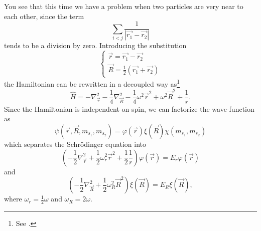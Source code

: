 \documentclass[a4paper,twoside,11pt]{book}
\begin{document}
You see that this time we have a problem when two particles are very near to each other, since the term
\begin{equation*}
	\sum_{i<j}\frac{1}{|\vec{r_1}-\vec{r_2}|}
\end{equation*}
tends to be a division by zero. Introducing the substitution
\begin{equation}
\begin{cases}
\vec{r}=\vec{r_1}-\vec{r_2} \\ 
\vec{R}=\frac{1}{2}(\vec{r_1}+\vec{r_2}) 
\end{cases}
\end{equation}
the Hamiltonian can be rewritten in a decoupled way as\footnote{See \cite{taut}.}
\begin{equation}
    \hat{H} = -\nabla_{\vec{r}}^2 - \frac{1}{4}\nabla_{\vec{R}}^2 - \frac{1}{4}\omega^2\vec{r}^2 + \omega^2\vec{R}^2 + \frac{1}{r}.
\end{equation}
Since the Hamiltonian is independent on spin, we can factorize the wave-function as
\begin{equation}
    \psi(\vec{r},\vec{R},m_{s_1},m_{s_2}) = \varphi(\vec{r})\xi(\vec{R})\chi(m_{s_1},m_{s_2})
\end{equation}
which separates the Schr\"{o}dinger equation into
\begin{equation}
    \left( -\frac{1}{2}\nabla_{\vec{r}}^2 + \frac{1}{2}\omega_r^2\vec{r}^2 + \frac{1}{2}\frac{1}{r} \right)\varphi(\vec{r}) = E_r\varphi(\vec{r})
    \label{eq:Seq_relative_distance}
\end{equation}
and
\begin{equation}
    \left( -\frac{1}{2}\nabla_{\vec{R}}^2 + \frac{1}{2}\omega_R^2\vec{R}^2 \right)\xi(\vec{R}) = E_R\xi(\vec{R}),
\end{equation}
where $\omega_r = \frac{1}{2}\omega$ and $\omega_R = 2\omega$.
\end{document}

